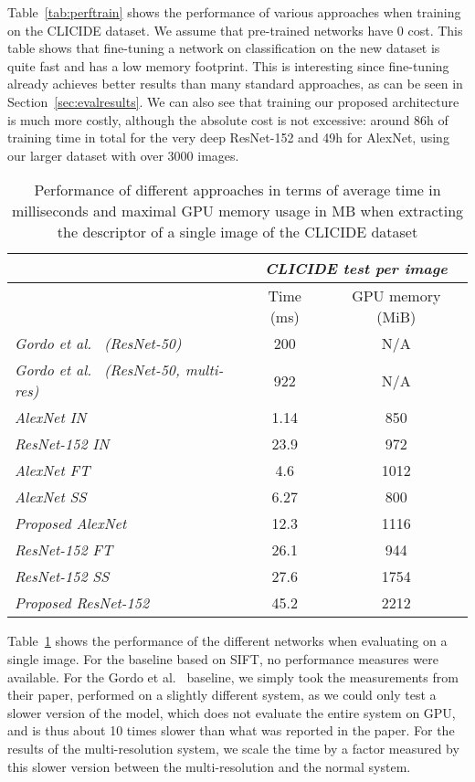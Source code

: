 Table~\ref{tab:perftrain} shows the performance of various approaches
when training on the CLICIDE dataset. We assume that pre-trained
networks have 0 cost. This table shows that fine-tuning a network
on classification on the new dataset is quite fast and has a low memory
footprint. This is interesting since fine-tuning already achieves better
results than many standard approaches, as can be seen in
Section~\ref{sec:evalresults}.
We can also see that training our proposed architecture is much
more costly, although the absolute cost is not excessive:
around 86h of training time in total for the very deep ResNet-152
and 49h for AlexNet, using our larger dataset with over 3000 images.

\begin{table}
\centering
\begin{tabular}{|l|c|c|}
\hline & \multicolumn{2}{c|}{\emph{CLICIDE test per image}}\\
\hline & Time (ms) & GPU memory (MiB)\\
\hline \emph{Gordo et al.~\cite{gordo_deep_2016} (ResNet-50)} & 200 & N/A\\
\hline \emph{Gordo et al.~\cite{gordo_deep_2016} (ResNet-50, multi-res)}
& 922 & N/A\\
\hline \emph{AlexNet IN} & 1.14 & 850\\
\hline \emph{ResNet-152 IN} & 23.9 & 972\\
\hline
\hline \emph{AlexNet FT} & 4.6 & 1012\\
\hline \emph{AlexNet SS} & 6.27 & 800\\
\hline \emph{Proposed AlexNet} & 12.3 & 1116\\
\hline \emph{ResNet-152 FT} & 26.1 & 944\\
\hline \emph{ResNet-152 SS} & 27.6 & 1754\\
\hline \emph{Proposed ResNet-152} & 45.2 & 2212\\
\hline
\end{tabular}
\caption{Performance of different approaches in terms of average time in milliseconds and
maximal GPU memory usage in MB when extracting the descriptor of a single image
of the CLICIDE dataset\label{tab:perftest}}
\end{table}

Table~\ref{tab:perftest} shows the performance of the different networks
when evaluating on a single image. For the baseline based on SIFT, no performance measures were available.
For the Gordo et al.~\cite{gordo_deep_2016} baseline, we simply took the
measurements from their paper, performed on a slightly different system,
as we could only test a slower version of the model, which does not
evaluate the entire system on GPU, and is thus about 10 times slower than
what was reported in the paper.
For the results of the multi-resolution system, we scale the time
by a factor measured by this slower version between the multi-resolution
and the normal system.

